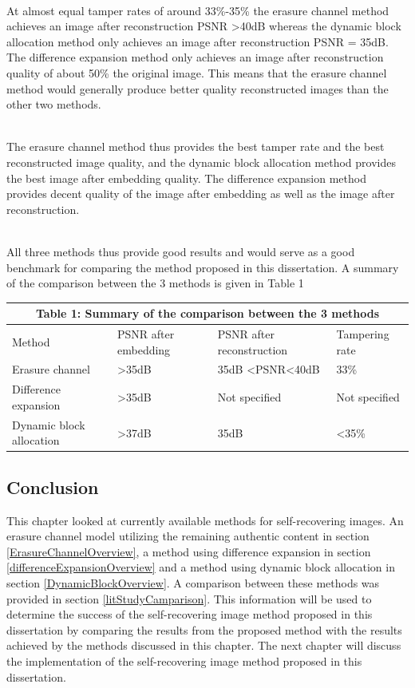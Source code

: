 \documentclass[12pt]{article}
\begin{document}
\hspace{0pt} \\
At almost equal tamper rates of around 33\%-35\% the erasure channel method achieves an image after reconstruction PSNR \textgreater 40dB whereas the dynamic block allocation method only achieves an image after reconstruction PSNR = 35dB.
The difference expansion method only achieves an image after reconstruction quality of about 50\% the original image.
This means that the erasure channel method would generally produce better quality reconstructed images than the other two methods.

\hspace{0pt} \\
The erasure channel method thus provides the best tamper rate and the best reconstructed image quality, and the dynamic block allocation method provides the best image after embedding quality.
The difference expansion method provides decent quality of the image after embedding as well as the image after reconstruction.

\hspace{0pt} \\
All three methods thus provide good results and would serve as a good benchmark for comparing the method proposed in this dissertation.
A summary of the comparison between the 3 methods is given in Table 1

\begin{center}
  \begin{tabular}{| l | l | l | l |}
    \hline
    \multicolumn{4}{|c|}{Table 1: Summary of the comparison between the 3 methods} \\
    \hline
    Method & PSNR after embedding & PSNR after reconstruction & Tampering rate \\ \hline
    Erasure channel& \textgreater35dB & 35dB \textless PSNR\textless 40dB & 33\% \\ \hline
    Difference expansion& \textgreater35dB & Not specified & Not specified \\ \hline
    Dynamic block allocation& \textgreater37dB & 35dB & \textless 35\% \\ \hline
    \hline
  \end{tabular}
\end{center}

\subsection{Conclusion}
This chapter looked at currently available methods for self-recovering images.
An erasure channel model utilizing the remaining authentic content in section \ref{ErasureChannelOverview}, a method using difference expansion in section \ref{differenceExpansionOverview} and a method using dynamic block allocation in section \ref{DynamicBlockOverview}.
A comparison between these methods was provided in section \ref{litStudyCamparison}.
This information will be used to determine the success of the self-recovering image method proposed in this dissertation by comparing the results from the proposed method with the results achieved by the methods discussed in this chapter.
The next chapter will discuss the implementation of the self-recovering image method proposed in this dissertation.  
\end{document}
